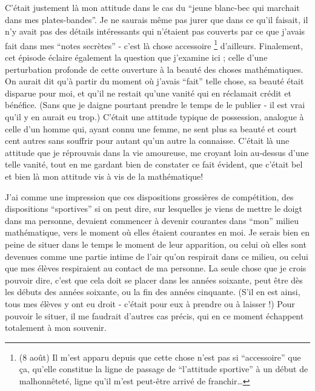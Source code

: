C'était justement là mon attitude dans le cas du ``jeune blanc-bec qui marchait dans mes plates-bandes''. Je ne saurais même pas jurer que dans ce qu'il faisait, il n'y avait pas des détails intéressants qui n'étaient pas couverts par ce que j'avais fait dans mes ``notes secrètes'' - c'est là chose accessoire \footnote{(8 août) Il m'est apparu depuis que cette chose n'est pas si ``accessoire'' que ça, qu'elle constitue la ligne de passage de ``l'attitude sportive'' à un début de malhonnêteté, ligne qu'il m'est peut-être arrivé de franchir\ldots} d'ailleurs. Finalement, cet épisode éclaire également la question que j'examine ici ; celle d'une perturbation profonde de cette ouverture à la beauté des choses mathématiques. On aurait dit qu'à partir du moment où j'avais ``fait'' telle chose, sa beauté était disparue pour moi, et qu'il ne restait qu'une vanité qui en réclamait crédit et bénéfice. (Sans que je daigne pourtant prendre le temps de le publier - il est vrai qu'il y en aurait eu trop.) C'était une attitude typique de possession, analogue à celle d'un homme qui, ayant connu une femme, ne sent plus sa beauté et court cent autres sans souffrir pour autant qu'un autre la connaisse. C'était là une attitude que je réprouvais dans la vie amoureuse, me croyant loin au-dessus d'une telle vanité, tout en me gardant bien de constater ce fait évident, que c'était bel et bien là mon attitude vis à vis de la mathématique!

J'ai comme une impression que ces dispositions grossières de compétition, des dispositions ``sportives'' si on peut dire, sur lesquelles je viens de mettre le doigt dans ma personne, devaient commencer à devenir courantes dans ``mon'' milieu mathématique, vers le moment où elles étaient courantes en moi. Je serais bien en peine de situer dans le temps le moment de leur apparition, ou celui où elles sont devenues comme une partie intime de l'air qu'on respirait dans ce milieu, ou celui que mes élèves respiraient au contact de ma personne. La seule chose que je crois pouvoir dire, c'est que cela doit se placer dans les années soixante, peut être dès les débuts des années soixante, ou la fin des années cinquante. (S'il en est ainsi, tous mes élèves y ont eu droit - c'était pour eux à prendre ou à laisser !) Pour pouvoir le situer, il me faudrait d'autres cas précis, qui en ce moment échappent totalement à mon souvenir.

